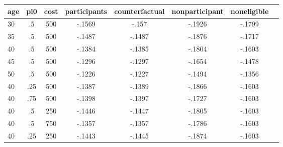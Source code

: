 \begin{table}[htbp]
\begin{tabular}{lccccccc} \hline \hline
 \multicolumn{1}{c}{ age }  & pi0  & cost  & participants  & counterfactual  & nonparticipant  & noneligible  \\  \hline 
       30 &        .5 &       500 &    -.1569 &     -.157 &    -.1926 &    -.1799 \\  
       35 &        .5 &       500 &    -.1487 &    -.1487 &    -.1876 &    -.1717 \\  
       40 &        .5 &       500 &    -.1384 &    -.1385 &    -.1804 &    -.1603 \\  
       45 &        .5 &       500 &    -.1296 &    -.1297 &    -.1654 &    -.1478 \\  
       50 &        .5 &       500 &    -.1226 &    -.1227 &    -.1494 &    -.1356 \\  
       40 &       .25 &       500 &    -.1387 &    -.1389 &    -.1866 &    -.1603 \\  
       40 &       .75 &       500 &    -.1398 &    -.1397 &    -.1727 &    -.1603 \\  
       40 &        .5 &       250 &    -.1446 &    -.1447 &    -.1805 &    -.1603 \\  
       40 &        .5 &       750 &    -.1357 &    -.1357 &    -.1786 &    -.1603 \\  
       40 &       .25 &       250 &    -.1443 &    -.1445 &    -.1874 &    -.1603 \\  
\hline \hline \end{tabular}
\end{table}
